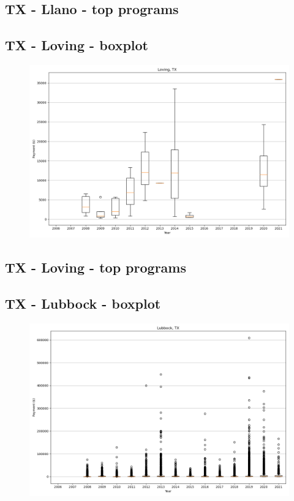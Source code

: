 \subsection*{TX - Llano - top programs}

\newpage
\subsection*{TX - Loving - boxplot}
\begin{figure}[h]
\centering
\includegraphics[width=7in]{../output/boxplots/counties/Loving-TX_boxplot.png}
\end{figure}


\subsection*{TX - Loving - top programs}

\newpage
\subsection*{TX - Lubbock - boxplot}
\begin{figure}[h]
\centering
\includegraphics[width=7in]{../output/boxplots/counties/Lubbock-TX_boxplot.png}
\end{figure}


